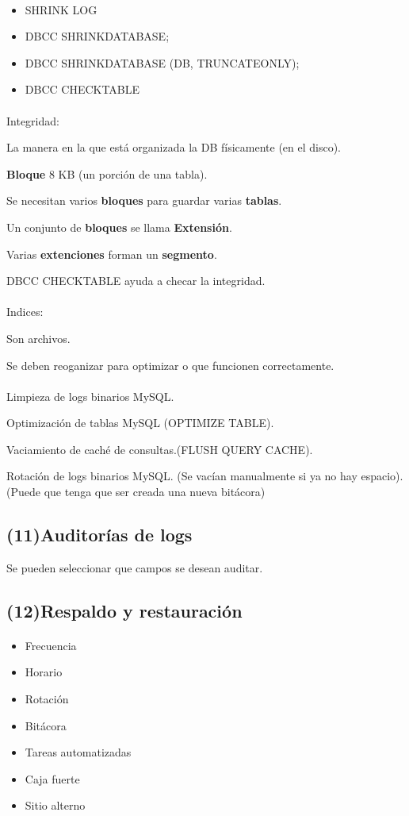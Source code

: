 \documentclass{article}
\begin{document}
\paragraph{}
\begin{itemize}
	\item
	SHRINK LOG
	\item
	DBCC SHRINKDATABASE;
	\item
	DBCC SHRINKDATABASE (DB, TRUNCATEONLY);
	\item
	DBCC CHECKTABLE
\end{itemize}


\paragraph{}
Integridad:

La manera en la que está organizada la DB físicamente (en el disco).

\textbf{Bloque} 8 KB (un porción de una tabla).

Se necesitan varios \textbf{bloques} para guardar varias \textbf{tablas}.

Un conjunto de \textbf{bloques} se llama \textbf{Extensión}.

Varias \textbf{extenciones} forman un \textbf{segmento}.

DBCC CHECKTABLE ayuda a checar la integridad.

\paragraph{}
Indices:

Son archivos.

Se deben reoganizar para optimizar o que funcionen correctamente.

\paragraph{}
Limpieza de logs binarios MySQL.

Optimización de tablas MySQL (OPTIMIZE TABLE).

Vaciamiento de caché de consultas.(FLUSH QUERY CACHE).

Rotación de logs binarios MySQL. (Se vacían manualmente si ya no hay espacio).
(Puede que tenga que ser creada una nueva bitácora)

\subsection{(11)Auditorías de logs}
Se pueden seleccionar que campos se desean auditar.

\subsection{(12)Respaldo y restauración}

\paragraph{}
\begin{itemize}
	\item
	Frecuencia
	\item
	Horario
	\item
	Rotación
	\item
	Bitácora
	\item
	Tareas automatizadas
	\item
	Caja fuerte
	\item
	Sitio alterno
\end{itemize}
\end{document}
